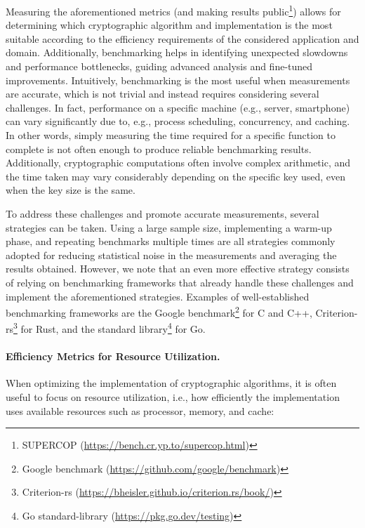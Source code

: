 Measuring the aforementioned metrics (and making results public\footnote{SUPERCOP (\url{https://bench.cr.yp.to/supercop.html})}) allows for determining which cryptographic algorithm and implementation is the most suitable according to the efficiency requirements of the considered application and domain. Additionally, benchmarking helps in identifying unexpected slowdowns and performance bottlenecks, guiding advanced analysis and fine-tuned improvements. Intuitively, benchmarking is the most useful when measurements are accurate, which is not trivial and instead requires considering several challenges. In fact, performance on a specific machine (e.g., server, smartphone) can vary significantly due to, e.g., process scheduling, concurrency, and caching. In other words, simply measuring the time required for a specific function to complete is not often enough to produce reliable benchmarking results. Additionally, cryptographic computations often involve complex arithmetic, and the time taken may vary considerably depending on the specific key used, even when the key size is the same.

To address these challenges and promote accurate measurements, several strategies can be taken. Using a large sample size, implementing a warm-up phase, and repeating benchmarks multiple times are all strategies commonly adopted for reducing statistical noise in the measurements and averaging the results obtained. However, we note that an even more effective strategy consists of relying on benchmarking frameworks that already handle these challenges and implement the aforementioned strategies. Examples of well-established benchmarking frameworks are the Google benchmark\footnote{Google benchmark (\url{https://github.com/google/benchmark})} for C and C++, Criterion-rs\footnote{Criterion-rs (\url{https://bheisler.github.io/criterion.rs/book/})} for Rust, and the standard library\footnote{Go standard-library (\url{https://pkg.go.dev/testing})} for Go.


\paragraph*{Efficiency Metrics for Resource Utilization.}

When optimizing the implementation of cryptographic algorithms, it is often useful to focus on resource utilization, i.e., how efficiently the implementation uses available resources such as processor, memory, and cache:

